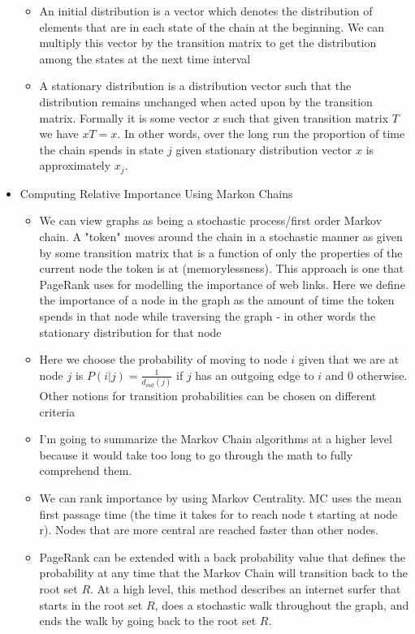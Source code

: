 \documentclass[a4paper]{article}
\begin{document}
\begin{itemize}
\begin{itemize}
\item An initial distribution is a vector which denotes the distribution of elements that are in each state of the chain at the beginning. We can multiply this vector by the transition matrix to get the distribution among the states at the next time interval

\item A stationary distribution is a distribution vector such that the distribution remains unchanged when acted upon by the transition matrix. Formally it is some vector $x$ such that given transition matrix $T$ we have $xT = x$. In other words, over the long run the proportion of time the chain spends in state $j$ given stationary distribution vector $x$ is approximately $x_j$.

\end{itemize}

\item Computing Relative Importance Using Markon Chains
\begin{itemize}
\item We can view graphs as being a stochastic process/first order Markov chain. A "token" moves around the chain in a stochastic manner as given by some transition matrix that is a function of only the properties of the current node the token is at (memorylessness). This approach is one that PageRank uses for modelling the importance of web links. Here we define the importance of a node in the graph as the amount of time the token spends in that node while traversing the graph - in other words the stationary distribution for that node

\item Here we choose the probability of moving to node $i$ given that we are at node $j$ is $P(i|j) = \frac{1}{d_{out}(j)}$ if $j$ has an outgoing edge to $i$ and $0$ otherwise. Other notions for transition probabilities can be chosen on different criteria

\item I'm going to summarize the Markov Chain algorithms at a higher level because it would take too long to go through the math to fully comprehend them.

\item We can rank importance by using Markov Centrality. MC uses the mean first passage time (the time it takes for to reach node t starting at node r). Nodes that are more central are reached faster than other nodes.

\item PageRank can be extended with a back probability value that defines the probability at any time that the Markov Chain will transition back to the root set $R$. At a high level, this method describes an internet surfer that starts in the root set $R$, does a stochastic walk throughout the graph, and ends the walk by going back to the root set $R$.


\end{itemize}
\end{itemize}
\end{document}

